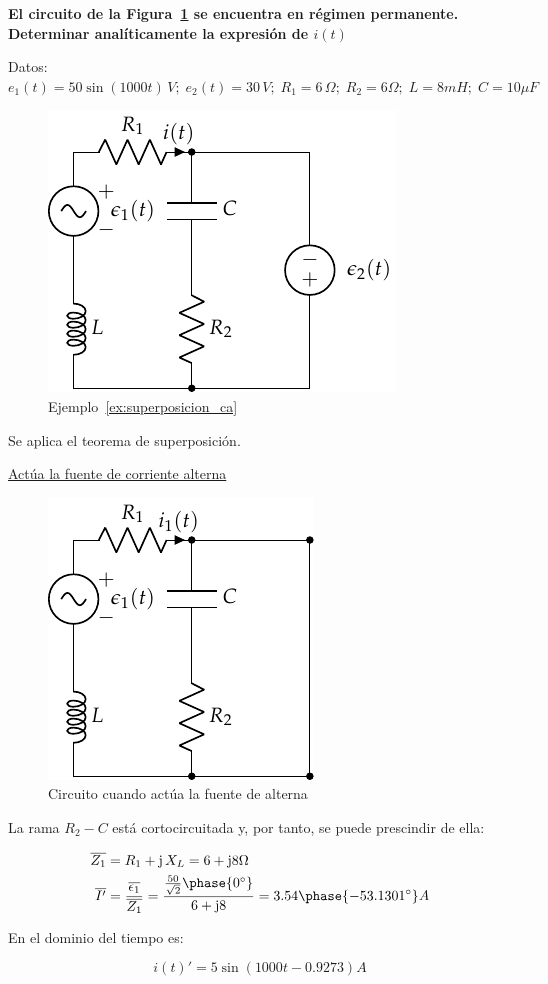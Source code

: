 \begin{example}\label{ex:superposicion_ca}
  \textbf{El circuito de la Figura~\ref{fig:superposicion1} se
    encuentra en régimen permanente. Determinar analíticamente la
    expresión de $i(t)$}

  Datos:
  $e_1(t) = {50 \sin(1000 t)}\,V;\; e_2(t) = {30}\,V;\; R_1 =
  6\,\Omega;\; R_2 = {6}{\Omega};\; L = {8}{mH};\; C = {10}{\mu F}$

\begin{figure}[H]
  \centering
  \includegraphics[width=0.25\linewidth]{../figs/superposicion1.pdf}
  \caption{Ejemplo~\ref{ex:superposicion_ca}}
  \label{fig:superposicion1}
\end{figure}

Se aplica el teorema de superposición.

\underline{Actúa la fuente de corriente alterna}

\begin{figure}[H]
  \centering
  \includegraphics[width=0.25\linewidth]{../figs/superposicion1_AC.pdf}
  \caption{Circuito cuando actúa la fuente de alterna}
  \label{fig:superposicion1_AC}
\end{figure}

La rama $R_2 - C$ está cortocircuitada y, por tanto, se puede
prescindir de ella:

\begin{align*}
  \overline{Z_1} &= R_1 + \mathrm{j}\,X_L = 6 + \mathrm{j}8\Omega\\
  \overline{I'} &= \dfrac{\overline{\epsilon_1}}{\overline{Z_1}} = \dfrac{\frac{50}{\sqrt{2}}\phase{0^\circ}}{6+\mathrm{j}8}=3.54\phase{-53.1301^\circ} A
\end{align*}

En el dominio del tiempo es:

\begin{equation*}
  i(t)' = 5\sin(1000t - 0.9273) A
\end{equation*}


\end{example}

